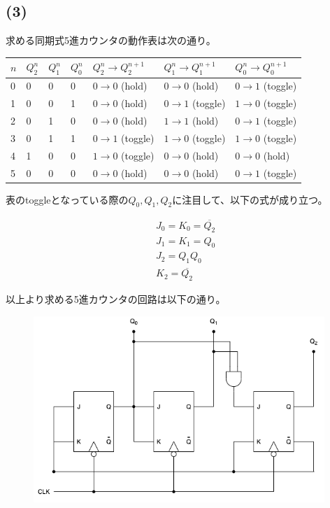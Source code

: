 \documentclass[a4paper,12pt,xelatex,ja=standard]{bxjsarticle}
\begin{document}
\subsection*{(3)}

求める同期式5進カウンタの動作表は次の通り。

\begin{table}[H]
  \centering
  \begin{tabular}{|l|l|l|l|l|l|l|}
  \hline
  $n$ & $Q^n_2$ & $Q^n_1$ & $Q^n_0$ & $Q^n_2 \to Q^{n+1}_2$ & $Q^n_1 \to Q^{n+1}_1$ & $Q^n_0 \to Q^{n+1}_0$ \\ \hline \hline
  0 & 0 & 0 & 0 & $0 \to 0$ (hold)   & $0 \to 0$ (hold)   & $0 \to 1$ (toggle) \\ \hline
  1 & 0 & 0 & 1 & $0 \to 0$ (hold)   & $0 \to 1$ (toggle) & $1 \to 0$ (toggle) \\ \hline
  2 & 0 & 1 & 0 & $0 \to 0$ (hold)   & $1 \to 1$ (hold)   & $0 \to 1$ (toggle) \\ \hline
  3 & 0 & 1 & 1 & $0 \to 1$ (toggle) & $1 \to 0$ (toggle) & $1 \to 0$ (toggle) \\ \hline
  4 & 1 & 0 & 0 & $1 \to 0$ (toggle) & $0 \to 0$ (hold)   & $0 \to 0$ (hold)   \\ \hline
  5 & 0 & 0 & 0 & $0 \to 0$ (hold)   & $0 \to 0$ (hold)   & $0 \to 1$ (toggle) \\ \hline
  \end{tabular}
\end{table}

表のtoggleとなっている際の$Q_0, Q_1, Q_2$に注目して、以下の式が成り立つ。

\begin{equation*}
  \begin{split}
    &J_0 = K_0 = \overline{Q_2} \\
    &J_1 = K_1 = Q_0 \\
    &J_2 = Q_1 Q_0 \\
    &K_2 = \overline{Q_2}
  \end{split}
\end{equation*}

以上より求める5進カウンタの回路は以下の通り。

\begin{figure}[H]
  \centering
  \includegraphics[width=11cm]{images/5_counter.png}
\end{figure}
\end{document}
